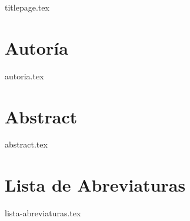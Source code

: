\documentclass[11pt]{report}
\begin{document}
\renewcommand{\figurename}{Imagen}
\renewcommand{\listfigurename}{Lista de Imágenes}


\thispagestyle{empty}
{titlepage.tex}

\newpage

\chapter*{Autoría}


{autoria.tex}



\chapter*{Abstract}

{abstract.tex}


\tableofcontents
\setcounter{page}{1}
\thispagestyle{plain}



\chapter*{Lista de Abreviaturas}

{lista-abreviaturas.tex}

\listoffigures
\thispagestyle{plain}

\listoftables
\thispagestyle{plain}

\end{document}
